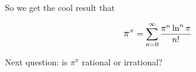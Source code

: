 \documentclass[14pt, oneside]{article}
\begin{document}
\medskip
\bigskip
\noindent
So we get the cool result that

{\Large
\begin{equation*}
{\mathlarger \pi^\pi = \sum\limits_{n=0}^{\infty} \dfrac{\pi^n \ln^n\pi}{n!}}
\end{equation*}}

\bigskip
\noindent
Next question: is $\pi^\pi$ rational or irrational? 
\end{document}
